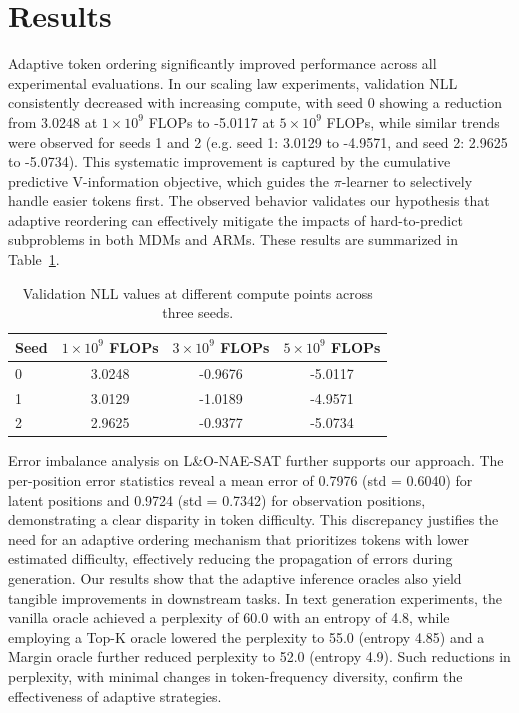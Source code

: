 \documentclass{article} %
\begin{document}
\section{Results}
Adaptive token ordering significantly improved performance across all experimental evaluations. In our scaling law experiments, validation NLL consistently decreased with increasing compute, with seed 0 showing a reduction from 3.0248 at \(1 \times 10^9\) FLOPs to -5.0117 at \(5 \times 10^9\) FLOPs, while similar trends were observed for seeds 1 and 2 (e.g. seed 1: 3.0129 to -4.9571, and seed 2: 2.9625 to -5.0734). This systematic improvement is captured by the cumulative predictive V-information objective, which guides the $\pi$-learner to selectively handle easier tokens first. The observed behavior validates our hypothesis that adaptive reordering can effectively mitigate the impacts of hard-to-predict subproblems in both MDMs and ARMs. These results are summarized in Table~\ref{tab:scaling}.

\begin{table}[h]
\centering
\begin{tabular}{lccc}
\hline
Seed & \(1 \times 10^9\) FLOPs & \(3 \times 10^9\) FLOPs & \(5 \times 10^9\) FLOPs \\
\hline
0 & 3.0248 & -0.9676 & -5.0117 \\
1 & 3.0129 & -1.0189 & -4.9571 \\
2 & 2.9625 & -0.9377 & -5.0734 \\
\hline
\end{tabular}
\caption{Validation NLL values at different compute points across three seeds.}
\label{tab:scaling}
\end{table}

Error imbalance analysis on L\&O-NAE-SAT further supports our approach. The per-position error statistics reveal a mean error of 0.7976 (std = 0.6040) for latent positions and 0.9724 (std = 0.7342) for observation positions, demonstrating a clear disparity in token difficulty. This discrepancy justifies the need for an adaptive ordering mechanism that prioritizes tokens with lower estimated difficulty, effectively reducing the propagation of errors during generation. Our results show that the adaptive inference oracles also yield tangible improvements in downstream tasks. In text generation experiments, the vanilla oracle achieved a perplexity of 60.0 with an entropy of 4.8, while employing a Top-K oracle lowered the perplexity to 55.0 (entropy 4.85) and a Margin oracle further reduced perplexity to 52.0 (entropy 4.9). Such reductions in perplexity, with minimal changes in token-frequency diversity, confirm the effectiveness of adaptive strategies.
\end{document}
